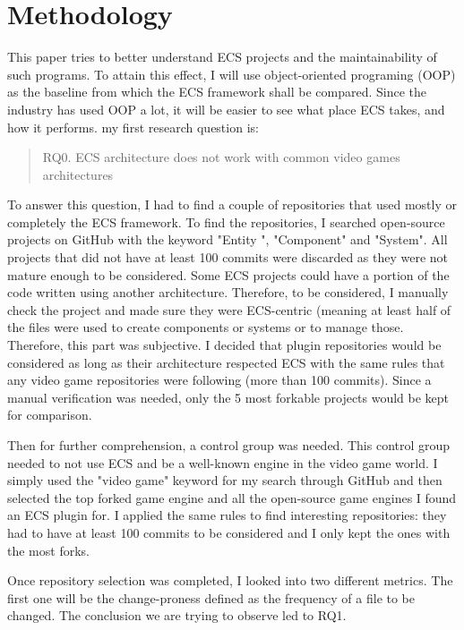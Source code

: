 \documentclass{IEEEcsmag}
\begin{document}
\section{Methodology}


This paper tries to better understand ECS projects and the maintainability of such programs. To attain this effect,  I will use object-oriented programing (OOP) as the baseline from which the ECS framework shall be compared. Since the industry has used OOP a lot, it will be easier to see what place ECS takes, and how it performs. my first research question is: 
\begin{quote}
    RQ0. ECS architecture does not work with common video games architectures
\end{quote}

To answer this question, I had to find a couple of repositories that used mostly or completely the ECS framework. To find the repositories, I searched open-source projects on GitHub with the keyword "Entity ", "Component" and "System". All projects that did not have at least 100 commits were discarded as they were not mature enough to be considered. Some  ECS projects could have a portion of the code written using another architecture. Therefore, to be considered, I manually check the project and made sure they were ECS-centric (meaning at least half of the files were used to create components or systems or to manage those. Therefore, this part was subjective. I decided that plugin repositories would be considered as long as their architecture respected ECS with the same rules that any video game repositories were following (more than 100 commits). Since a manual verification was needed, only the 5 most forkable projects would be kept for comparison.

Then for further comprehension, a control group was needed. This control group needed to not use ECS and be a well-known engine in the video game world. I simply used the "video game" keyword for my search through GitHub and then selected the top forked game engine and all the open-source game engines I found an ECS plugin for. I applied the same rules to find interesting repositories: they had to have at least 100 commits to be considered and I only kept the ones with the most forks. 

Once repository selection was completed, I looked into two different metrics. The first one will be the change-proness defined as the frequency of a file to be changed. The conclusion we are trying to observe led to RQ1. 
\end{document}
